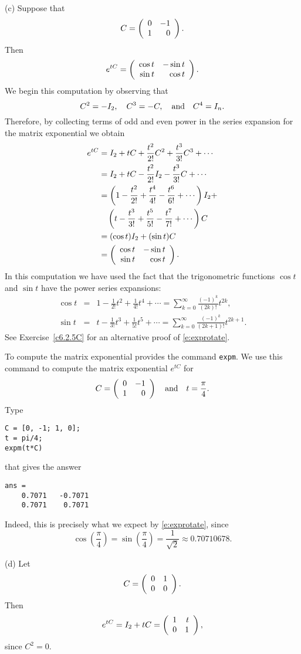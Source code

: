 \documentclass{ximera}
\begin{document}
\noindent (c) \quad Suppose that
     \[
                C = \left(\begin{array}{rr} 0 & -1\\ 1 &0\end{array}\right).
      \]
Then
\begin{equation} \label{e:exprotate}
e^{tC} = \left(\begin{array}{rr} \cos t & -\sin t\\ \sin t &\cos t\end{array}\right).
\end{equation}
We begin this computation by observing that
\[
C^2 = -I_2, \quad C^3 = -C, \quad\mbox{and}\quad C^4 = I_n.
\]
Therefore, by collecting terms of odd and even power in the series
expansion for the matrix exponential we obtain
\begin{align*}
e^{tC} & =  I_2 + tC + \frac{t^2}{2!} C^2 +  \frac{t^3}{3!}C^3 +\cdots\\
     & =  I_2 + tC - \frac{t^2}{2!}I_2 - \frac{t^3}{3!}C +\cdots\\
     & =  \left(1 - \frac{t^2}{2!} + \frac{t^4}{4!} - \frac{t^6}{6!} +
		\cdots \right)I_2 + \\
	 &\quad \left(t - \frac{t^3}{3!} + \frac{t^5}{5!} - \frac{t^7}{7!} +
	\cdots \right)C \\
     & =  (\cos t)I_2 + (\sin t)C \\
     & =  \left(\begin{array}{rr} \cos t & -\sin t\\ \sin t &\cos t\end{array}\right).
     \end{align*}
In this computation we have used the fact that the trigonometric
functions $\cos t$ and $\sin t$ have the power series expansions:
\begin{eqnarray*}
\cos t & = & 1-\frac{1}{2!}t^2+\frac{1}{4!} t^4 + \cdots =
\sum\limits_{k=0}^\infty\frac{(-1)^k}{(2k)!} t^{2k},\\
\sin t & = & t-\frac{1}{3!} t^3 + \frac{1}{5!} t^5 + \cdots
   = \sum\limits_{k=0}^\infty \frac{(-1)^k}{(2k+1)!} t^{2k+1}.
\end{eqnarray*}
See Exercise~\ref{c6.2.5C} for an alternative proof of \eqref{e:exprotate}.

To compute the matrix exponential
\Matlab{} provides the command
{\tt expm}.  We use this command to compute
the matrix exponential $e^{tC}$ for
\[
C=\left(\begin{array}{rr} 0 & -1\\ 1 &0\end{array}\right) \quad\mbox{and}\quad t=\frac{\pi}{4}.
\]
Type
\begin{verbatim}
C = [0, -1; 1, 0];
t = pi/4;
expm(t*C)
\end{verbatim}
that gives the answer
\begin{verbatim}
ans =
    0.7071   -0.7071
    0.7071    0.7071
\end{verbatim}
Indeed, this is precisely what we expect by \eqref{e:exprotate},
since
\[
\cos\left(\frac{\pi}{4}\right)=\sin\left(\frac{\pi}{4}\right)=
\frac{1}{\sqrt{2}}\approx 0.70710678.
\]

\noindent (d) \quad Let
\[
C = \left(\begin{array}{rr} 0 & 1\\ 0 &0\end{array}\right).
\]
Then
\begin{equation}  \label{e:nilpotent}
e^{tC} = I_2 + tC = \left(\begin{array}{rr} 1 & t\\ 0 &1\end{array}\right),
\end{equation}
since $C^2=0$.



\end{document}
